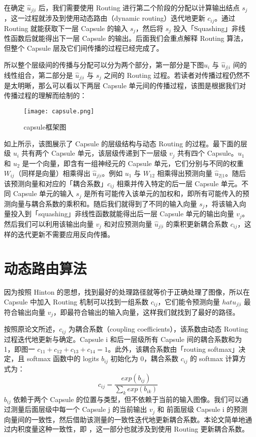 在确定 $\hat{u}_{j|i}$ 后，我们需要使用 Routing 进行第二个阶段的分配以计算输出结点 $s_j$，这一过程就涉及到使用动态路由（dynamic routing）迭代地更新 $c_{ij}$。通过 Routing 就能获取下一层 Capsule 的输入 $s_j$，然后将 $s_j$ 投入「Squashing」非线性函数后就能得出下一层 Capsule 的输出。后面我们会重点解释 Routing 算法，但整个 Capsule 层及它们间传播的过程已经完成了。

所以整个层级间的传播与分配可以分为两个部分，第一部分是下图$ u_i$ 与 $\hat{u}_{j|i}$ 间的线性组合，第二部分是 $\hat{u}_{j|i}$ 与 $s_j$ 之间的 Routing 过程。若读者对传播过程仍然不是太明晰，那么可以看以下两层 Capsule 单元间的传播过程，该图是根据我们对传播过程的理解而绘制的：
\begin{figure}[H]
	\centering
	\texttt{[image: capsule.png]}
	\caption{capsule框架图}
	\label{fig:1}
\end{figure}
如上所示，该图展示了 Capsule 的层级结构与动态 Routing 的过程。最下面的层级 $u_i$ 共有两个 Capsule 单元，该层级传递到下一层级 $v_j$ 共有四个 Capsule。$u_1$ 和 $u_2$ 是一个向量，即含有一组神经元的 Capsule 单元，它们分别与不同的权重 $W_{ij}$（同样是向量）相乘得出 $\hat{u}_{j|i}$。例如 $u_1$ 与 $W_{12}$ 相乘得出预测向量 $\hat{u}_{2|1}$。随后该预测向量和对应的「耦合系数」$c_{ij}$ 相乘并传入特定的后一层 Capsule 单元。不同 Capsule 单元的输入 $s_j$ 是所有可能传入该单元的加权和，即所有可能传入的预测向量与耦合系数的乘积和。随后我们就得到了不同的输入向量 $s_j$，将该输入向量投入到「squashing」非线性函数就能得出后一层 Capsule 单元的输出向量 $v_j$。然后我们可以利用该输出向量 $v_j$ 和对应预测向量 $\hat{u}_{j|i}$ 的乘积更新耦合系数 $c_{ij}$，这样的迭代更新不需要应用反向传播。
\section{动态路由算法}
因为按照 Hinton 的思想，找到最好的处理路径就等价于正确处理了图像，所以在 Capsule 中加入 Routing 机制可以找到一组系数 $c_{ij}$，它们能令预测向量 $hat{u}_{j|i}$ 最符合输出向量 $v_j$，即最符合输出的输入向量，这样我们就找到了最好的路径。

按照原论文所述，$c_{ij}$ 为耦合系数（coupling coefficients），该系数由动态 Routing 过程迭代地更新与确定。Capsule i 和后一层级所有 Capsule 间的耦合系数和为 1，即图一 $c_{11}+c_{12}+c_{13}+c_{14}=1$。此外，该耦合系数由「routing softmax」决定，且 softmax 函数中的 logits $b_{ij}$ 初始化为 0，耦合系数 $c_{ij}$ 的 softmax 计算方式为：
\begin{equation}
	c_{ij}=\frac{exp(b_{ij})}{\sum_{k}exp(b_{ik})}
\end{equation}
$b_{ij}$ 依赖于两个 Capsule 的位置与类型，但不依赖于当前的输入图像。我们可以通过测量后面层级中每一个 Capsule j 的当前输出 $v_j$ 和 前面层级 Capsule i 的预测向量间的一致性，然后借助该测量的一致性迭代地更新耦合系数。本论文简单地通过内积度量这种一致性，即 ，这一部分也就涉及到使用 Routing 更新耦合系数。

